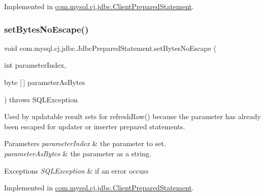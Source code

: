 Implemented in \mbox{\hyperlink{classcom_1_1mysql_1_1cj_1_1jdbc_1_1_client_prepared_statement_ae32665d789135291c132d6f7cff0d136}{com.\+mysql.\+cj.\+jdbc.\+Client\+Prepared\+Statement}}.

\mbox{\label{interfacecom_1_1mysql_1_1cj_1_1jdbc_1_1_jdbc_prepared_statement_a46f072b1d5f3463b8371262dc5ed9ead}} 
\subsubsection{\texorpdfstring{set\+Bytes\+No\+Escape()}{setBytesNoEscape()}}
{\footnotesize\ttfamily void com.\+mysql.\+cj.\+jdbc.\+Jdbc\+Prepared\+Statement.\+set\+Bytes\+No\+Escape (\begin{DoxyParamCaption}\item[{int}]{parameter\+Index,  }\item[{byte \mbox{[}$\,$\mbox{]}}]{parameter\+As\+Bytes }\end{DoxyParamCaption}) throws S\+Q\+L\+Exception}

Used by updatable result sets for refresh\+Row() because the parameter has already been escaped for updater or inserter prepared statements.


\begin{DoxyParams}{Parameters}
{\em parameter\+Index} & the parameter to set. \\
\hline
{\em parameter\+As\+Bytes} & the parameter as a string.\\
\hline
\end{DoxyParams}

\begin{DoxyExceptions}{Exceptions}
{\em S\+Q\+L\+Exception} & if an error occurs \\
\hline
\end{DoxyExceptions}


Implemented in \mbox{\hyperlink{classcom_1_1mysql_1_1cj_1_1jdbc_1_1_client_prepared_statement_a7db4bf1c51418004ea1482b72d2c7913}{com.\+mysql.\+cj.\+jdbc.\+Client\+Prepared\+Statement}}.

\mbox{\label{interfacecom_1_1mysql_1_1cj_1_1jdbc_1_1_jdbc_prepared_statement_aac822ef5e0e6cb44d83c2b0afb4078fe}} 
